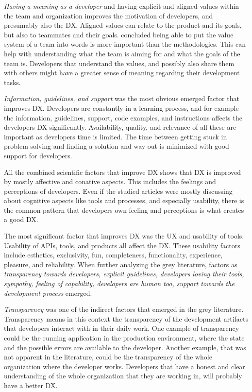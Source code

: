 \documentclass[english, 12pt, a4paper, sci, utf8, a-1b, online]{aaltothesis}
\newcounter{subsubsubsection}[subsubsection]
\begin{document}
\textit{Having a meaning as a developer} and having explicit and aligned values within the team and organization improves the motivation of developers, and presumably also the DX. Aligned values can relate to the product and its goals, but also to teammates and their goals. \textcite{fagerholm2014examining} concluded being able to put the value system of a team into words is more important than the methodologies. This can help with understanding what the team is aiming for and what the goals of the team is. Developers that understand the values, and possibly also share them with others might have a greater sense of meaning regarding their development tasks.

\textit{Information, guidelines, and support} was the most obvious emerged factor that improves DX. Developers are constantly in a learning process, and for example the information, guidelines, support, code examples, and instructions affects the developers DX significantly. Availability, quality, and relevance of all these are important as developers time is limited. The time between getting stuck in problem solving and finding a solution and way out is minimized with good support for developers.

All the combined scientific factors that improve DX shows that DX is improved by mostly affective and conative aspects. This includes the feelings and perceptions of developers. Even if the studied articles were mostly discussing about cognitive aspects like tools and processes, and especially usability, there is the common pattern that developers own feeling and perceptions is what creates a good DX.


The most significant factor that improves DX was the UX and usability of tools. Usability of APIs, tools, and products all affect the DX. These usability factors include esthetics, exclusivity, fun, completeness, functionality, experience, pleasure, and reliability. When further analyzing the grey literature, factors as \textit{transparency towards developers,	explicit guidelines, developers loving their tools, sympathy, feeling of capability, developers are human too, support towards the development process} emerged.

\textit{Transparency} was one of the indirect factors that emerged in the grey literature. Transparency means in this context the transparency of the development artifacts that developers interact with in their daily work. One example of transparency could be the running application in the production environment, where the state and the possible errors are available to the developer. Another example, that was not apparent in the literature, could be the transparency of the whole organization where the developer works. Developers that have a honest and clear understanding of the whole organization that they are working in, will probably have a better DX.
\end{document}

